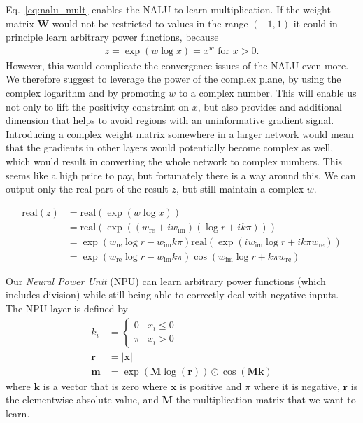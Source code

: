 \documentclass[9pt]{article}
\newcommand{\real}{\text{real}}
\begin{document}
Eq.~\ref{eq:nalu_mult} enables the NALU to learn multiplication. If the weight
matrix $\bm W$ would not be restricted to values in the range $(-1,1)$ it could
in principle learn arbitrary power functions, because
\begin{align}
  z = \exp(w\log x) = x^w \text{ for } x>0.
\end{align}
However, this would complicate the convergence issues of the NALU even more.
We therefore suggest to leverage the power of the complex plane, by using the
complex logarithm and by promoting $w$ to a complex number.  This will enable
us not only to lift the positivity constraint on $x$, but also provides and
additional dimension that helps to avoid regions with an uninformative gradient
signal.
Introducing a complex weight matrix somewhere in a larger network would mean that
the gradients in other layers would potentially become complex as well, which
would result in converting the whole network to complex numbers.
This seems like a high price to pay, but fortunately there is a way around this.
We can output only the real part of the result $z$, but still maintain a complex $w$.

\newcommand{\wre}{w_{\text{re}}}
\newcommand{\wim}{w_{\text{im}}}
\begin{align}
  \real(z) &= \real(\exp(w\log x)) \\
    &= \real(\exp((\wre + i\wim) (\log r + ik\pi))) \\
    &= \exp(\wre\log r - \wim k\pi) \real(\exp(i\wim\log r + ik\pi\wre)) \\
    &= \exp(\wre\log r - \wim k\pi) \cos(\wim\log r + k\pi\wre)
\end{align}


Our \emph{Neural Power Unit} (NPU) can learn arbitrary power functions (which
includes division) while still being able to correctly deal with negative
inputs.  The NPU layer is defined by
\begin{align}
  k_i &= \begin{cases}
     0  & x_i \leq 0 \\
    \pi & x_i > 0
  \end{cases} \\
  \bm r &= |\bm x| \\
  \bm m &= \exp(\bm M \log(\bm r)) \odot \cos(\bm M \bm k)
\end{align}
where $\bm k$ is a vector that is zero where $\bm x$ is positive and $\pi$
where it is negative, $\bm r$ is the elementwise absolute value, and $\bm M$
the multiplication matrix that we want to learn.
\end{document}
